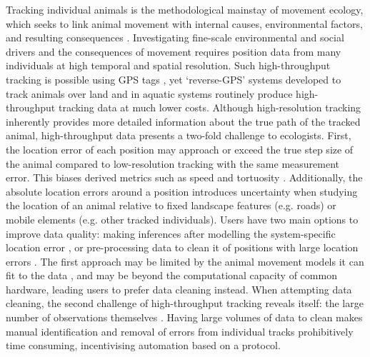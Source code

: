 \documentclass[10pt,paper=a4,headings=standardclasses
]{scrartcl}
\begin{document}
Tracking individual animals is the methodological mainstay of movement ecology, which seeks to link animal movement with internal causes, environmental factors, and resulting consequences \citep{nathan2008a, holyoak2008}. 
Investigating fine-scale environmental and social drivers and the consequences of movement requires position data from many individuals at high temporal and spatial resolution.
Such high-throughput tracking is possible using GPS tags \citep[see recent examples in][]{strandburg-peshkin2015, papageorgiou2019, harel2016}, yet ‘reverse-GPS’ systems developed to track animals over land \citep{toledo2014, weiser2016, toledo2016,toledo2020, maccurdy2009, maccurdy2019} and in aquatic systems \citep{hussey2015, baktoft2019, baktoft2017,jung2015} routinely produce high-throughput tracking data at much lower costs.
Although high-resolution tracking inherently provides more detailed information about the true path of the tracked animal, high-throughput data presents a two-fold challenge to ecologists.
First, the location error of each position may approach or exceed the true step size of the animal compared to low-resolution tracking with the same measurement error.
This biases derived metrics such as speed and tortuosity \citep[see][]{ranacher2016, noonan2019, hurford2009, calenge2009}.
Additionally, the absolute location errors around a position introduces uncertainty when studying the location of an animal relative to fixed landscape features (e.g. roads) or mobile elements (e.g. other tracked individuals).
Users have two main options to improve data quality: making inferences after modelling the system-specific location error \citep{fleming2014a, fleming2020, jonsen2003, jonsen2005, johnson2008, patterson2008}, or pre-processing data to clean it of positions with large location errors \citep{bjorneraas2010}.
The first approach may be limited by the animal movement models it can fit to the data \citep{fleming2014a, noonan2019, fleming2020}, and may be beyond the computational capacity of common hardware, leading users to prefer data cleaning instead.
When attempting data cleaning, the second challenge of high-throughput tracking reveals itself: the large number of observations themselves \citep{weiser2016, toledo2020}.
Having large volumes of data to clean makes manual identification and removal of errors from individual tracks prohibitively time consuming, incentivising automation based on a protocol.
\end{document}
